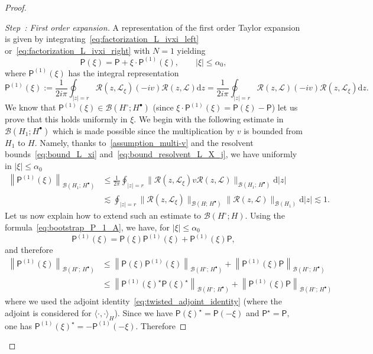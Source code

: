 \documentclass[10pt]{amsart}
\theoremstyle{definition}\newtheorem{defi}[theo]{Definition}\newtheorem{rema}[theo]{Remark}\newtheorem{exam}[theo]{Example}\newtheorem{exem}[theo]{Example}\newtheorem{nota}[theo]{Notation}
\renewcommand{\d}{\mathrm{d}}
\newcommand{\LL}{\mathcal{L}}
\newcommand{\PP}{\mathsf{P}}
\newcommand{\RR}{\mathcal{R}}
\newcommand{\BBB}{\mathscr{B}}
\newcommand{\Ss}{H}
\newcommand{\Ssp}{H^{\bullet}}
\newcommand{\Ssm}{H^{\circ}}
\renewcommand*\le{\leqslant}
\newcommand{\la}{\langle}
\newcommand{\ra}{\rangle}
\newcounter{stepcount}
\newenvironment{step}[1]{\refstepcounter{stepcount}\begin{proof}[Step~\thestepcount: #1]}{\let\qed\relax\end{proof}}
\begin{document}
\begin{proof}
\setcounter{stepcount}{0}
\begin{step}{{First order expansion}}\label{prflemm3.4stp1}
A representation of the first order Taylor expansion is given by integrating~\eqref{eq:factorization_L_ivxi_left} or~\eqref{eq:factorization_L_ivxi_right} with $N = 1$ yielding
\[
\PP(\xi) = \PP + \xi \cdot \PP^{(1)}(\xi), \qquad | \xi | \le \alpha_0,
\]
where $\PP^{(1)}(\xi)$ has the integral representation
\[
\PP^{(1)}(\xi) := \frac{1}{2 i \pi} \oint_{|z| = r} \RR(z,\LL_{\xi}) (- i v) \RR(z,\LL) \d z = \frac{1}{2 i \pi} \oint_{|z| = r} \RR(z,\LL) (- i v) \RR(z,\LL_{\xi}) \d z.
\]
We know that $\PP^{(1)}(\xi) \in \BBB(\Ssm ; \Ssp)$ (since $\xi\cdot \PP^{(1)}(\xi)=\PP(\xi)-\PP$) let us prove that this holds uniformly in $\xi$. We begin with the following estimate in $\BBB(\Ss_{1};\Ssp)$ which is made possible since the multiplication by $v$ is bounded from $\Ss_{1}$ to $\Ss$. Namely, thanks to~\eqref{assumption_multi-v} and the resolvent bounds~\eqref{eq:bound_L_xi} and~\eqref{eq:bound_resolvent_L_X_j}, we have uniformly in $|\xi| \le \alpha_0$
\begin{equation}\label{eq:bound_PP1_H1X*}
\begin{split}
\left\| \PP^{(1)}(\xi) \right\|_{\BBB(\Ss_{1} ;\,\Ssp)} & \le \frac{1}{2 \pi} \oint_{|z|=r} \| \RR(z,\LL_{\xi}) v \RR(z,\LL) \|_{\BBB(\Ss_{1} ;\,\Ssp) } \d |z| \\
& \lesssim \oint_{|z|=r} \| \RR(z,\LL_{\xi}) \|_{\BBB(\Ss ;\,\Ssp) } \| \RR(z,\LL) \|_{\BBB(\Ss_{1})} \d |z|\lesssim 1.
\end{split}
\end{equation}
Let us now explain how to extend such an estimate to $\BBB(\Ssm;\Ss)$. Using the formula~\eqref{eq:bootstrap_P_1_A}, we have, for $|\xi| \le \alpha_0$
\[
\PP^{(1)}(\xi) = \PP(\xi) \PP^{(1)}(\xi) + \PP^{(1)}(\xi) \PP,
\]
and therefore
\begin{align*}
\left\| \PP^{(1)}(\xi) \right\|_{\BBB(\Ssm ;\,\Ssp)} & \le \left\| \PP(\xi) \PP^{(1)}(\xi) \right\|_{\BBB(\Ssm ;\,\Ssp)} + \left\| \PP^{(1)}(\xi) \PP \right\|_{\BBB(\Ssm ;\,\Ssp)}\\
& \le \left\| \PP^{(1)}(\xi)^{\star} \PP(\xi)^{\star} \right\|_{\BBB(\Ssm ;\,\Ssp)} + \left\| \PP^{(1)}(\xi) \PP \right\|_{\BBB(\Ssm ;\,\Ssp)}
\end{align*}
where we used the adjoint identity~\eqref{eq:twisted_adjoint_identity} (where the adjoint is considered for $\la \cdot, \cdot \ra_{\Ss}$). Since we have $\PP(\xi)^\star = \PP(-\xi)$ and $\PP^\star = \PP,$ one has $\PP^{(1)}(\xi)^{\star}=-\PP^{(1)}(-\xi)$. Therefore

\end{step}
\end{proof}
\end{document}
